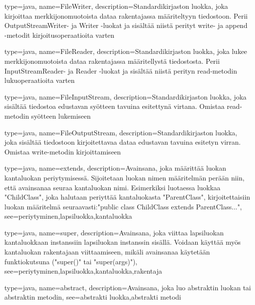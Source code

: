 {
	type=java,
	name=FileWriter,
	description={Standardikirjaston luokka, joka kirjoittaa merkkijonomuotoista dataa rakentajassa
määriteltyyn tiedostoon. Perii OutputStreamWriter- ja Writer -luokat ja sisältää niistä perityt
write- ja append -metodit kirjoitusoperaatioita varten}
}

{
	type=java,
	name=FileReader,
	description={Standardikirjaston luokka, joka lukee merkkijonomuotoista dataa rakentajassa
määritellystä tiedostosta. Perii InputStreamReader- ja Reader -luokat ja sisältää niistä perityn
read-metodin lukuoperaatioita varten}
}

{
	type=java,
	name=FileInputStream,
	description={Standardikirjaston luokka, joka sisältää tiedostoa edustavan syötteen tavuina
esitettynä virtana. Omistaa read-metodin syötteen lukemiseen}
}

{
	type=java,
	name=FileOutputStream,
	description={Standardikirjaston luokka, joka sisältää tiedostoon kirjoitettavaa dataa
edustavan tavuina esitetyn virran. Omistaa write-metodin kirjoittamiseen}
}

{
	type=java,
	name=extends,
	description={Avainsana, joka määrittää luokan kantaluokan periytymisessä. Sijoitetaan luokan
nimen määritelmän perään niin, että avainsanaa seuraa kantaluokan nimi. Esimerkiksi luotaessa
luokkaa "ChildClass", joka halutaan periyttää kantaluokasta "ParentClass", kirjoitettaisiin luokan
määritelmä seuraavasti:\newline{}"public class ChildClass extends ParentClass..."},
	see={periytyminen,lapsiluokka,kantaluokka}
}

{
	type=java,
	name=super,
	description={Avainsana, joka viittaa lapsiluokan kantaluokkaan instanssiin lapsiluokan
instanssin sisällä. Voidaan käyttää myös kantaluokan rakentajaan viittaamiseen, mikäli
avainsanaa käytetään funktiokutsuna ("super()" tai "super(args)")},
	see={periytyminen,lapsiluokka,kantaluokka,rakentaja}
}

{
	type=java,
	name=abstract,
	description={Avainsana, joka luo abstraktin luokan tai abstraktin metodin},
	see={abstrakti luokka,abstrakti metodi}
}